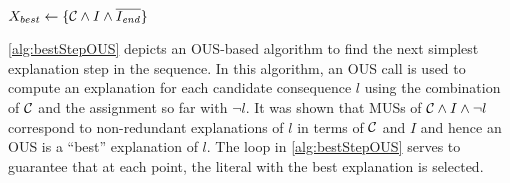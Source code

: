 \begin{algorithm}[t]
  \caption{$\call{bestStep--OUS}({\cal C},f,I,\Iend)$}
  \label{alg:bestStepOUS}
$X_{best} \gets \{{\cal C} \land I \land \overline{I_{\mathit{end}}}\}$\;
\end{algorithm}

\cref{alg:bestStepOUS} depicts an OUS-based algorithm to find the next simplest explanation step in the sequence. 
In this algorithm, an OUS call is used to compute an explanation for each candidate consequence $l$ using the combination of $\mathcal{C} $ and the assignment so far with $\lnot l$. 
It was shown that MUSs of $\mathcal{C} \land I\land\lnot l$ correspond to non-redundant explanations of $l$ in terms of $\mathcal{C} $ and $I$ and hence an OUS is a ``best'' explanation of $l$. 
The loop in \cref{alg:bestStepOUS} serves to guarantee that at each point, the literal with the best explanation is selected. 





